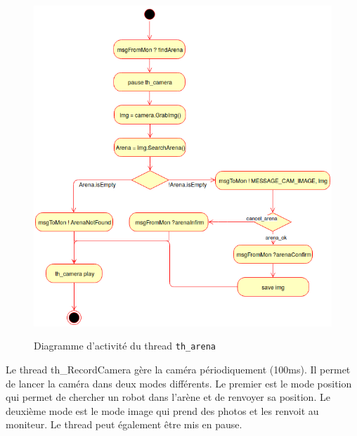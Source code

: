 \documentclass[11pt, a4paper]{paper}
\begin{document}
\begin{figure}[htbp]
\label{fig:act_envoyer}
\begin{center}
{\includegraphics[scale=.3]{./dossier_conception/th_arena}}
{\caption{Diagramme d'activité du thread {\tt th\_arena}}}
\end{center}
\end{figure}
\FloatBarrier

{Le thread th\_RecordCamera gère la caméra périodiquement (100ms). Il permet de lancer la caméra dans deux modes différents. Le premier est le mode position qui permet de chercher un robot dans l'arène et de renvoyer sa position. Le deuxième mode est le mode image qui prend des photos et les renvoit au moniteur. Le thread peut également être mis en pause.}
\end{document}
